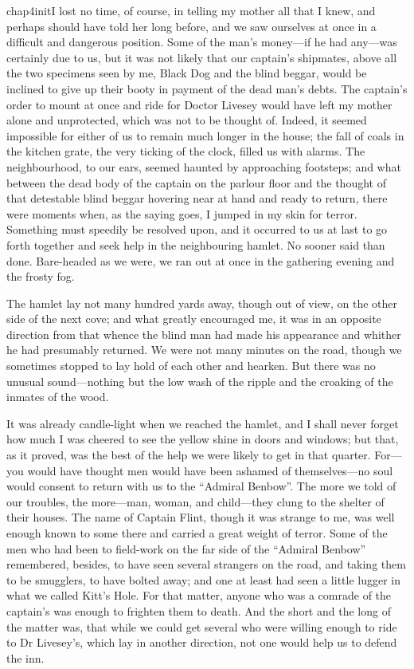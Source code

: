  
   \lettrine[lines=4,image=true]{chap4initI}{} lost no time, of course, in telling my mother all that I knew, and perhaps should have told her long before, and we saw ourselves at once in a difficult and dangerous position. Some of the man’s money---if he had any---was certainly due to us, but it was not likely that our captain’s shipmates, above all the two specimens seen by me, Black Dog and the blind beggar, would be inclined to give up their booty in payment of the dead man’s debts. The captain’s order to mount at once and ride for Doctor Livesey would have left my mother alone and unprotected, which was not to be thought of. Indeed, it seemed impossible for either of us to remain much longer in the house; the fall of coals in the kitchen grate, the very ticking of the clock, filled us with alarms. The neighbourhood, to our ears, seemed haunted by approaching footsteps; and what between the dead body of the captain on the parlour floor and the thought of that detestable blind beggar hovering near at hand and ready to return, there were moments when, as the saying goes, I jumped in my skin for terror. Something must speedily be resolved upon, and it occurred to us at last to go forth together and seek help in the neighbouring hamlet. No sooner said than done. Bare-headed as we were, we ran out at once in the gathering evening and the frosty fog.

The hamlet lay not many hundred yards away, though out of view, on the other side of the next cove; and what greatly encouraged me, it was in an opposite direction from that whence the blind man had made his appearance and whither he had presumably returned. We were not many minutes on the road, though we sometimes stopped to lay hold of each other and hearken. But there was no unusual sound---nothing but the low wash of the ripple and the croaking of the inmates of the wood.

It was already candle-light when we reached the hamlet, and I shall never forget how much I was cheered to see the yellow shine in doors and windows; but that, as it proved, was the best of the help we were likely to get in that quarter. For---you would have thought men would have been ashamed of themselves---no soul would consent to return with us to the \enquote{Admiral Benbow}. The more we told of our troubles, the more---man, woman, and child---they clung to the shelter of their houses. The name of Captain Flint, though it was strange to me, was well enough known to some there and carried a great weight of terror. Some of the men who had been to field-work on the far side of the \enquote{Admiral Benbow} remembered, besides, to have seen several strangers on the road, and taking them to be smugglers, to have bolted away; and one at least had seen a little lugger in what we called Kitt’s Hole. For that matter, anyone who was a comrade of the captain’s was enough to frighten them to death. And the short and the long of the matter was, that while we could get several who were willing enough to ride to Dr Livesey’s, which lay in another direction, not one would help us to defend the inn.

